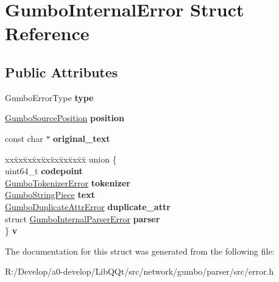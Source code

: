 \hypertarget{struct_gumbo_internal_error}{}\section{Gumbo\+Internal\+Error Struct Reference}
\label{struct_gumbo_internal_error}
\subsection*{Public Attributes}
\begin{DoxyCompactItemize}
\item 
\mbox{\label{struct_gumbo_internal_error_ae91295877ddbb3e94efdcfb4e093579c}} 
Gumbo\+Error\+Type {\bfseries type}
\item 
\mbox{\label{struct_gumbo_internal_error_aca2cd175d345fe73c4079b1c98227b16}} 
\mbox{\hyperlink{struct_gumbo_source_position}{Gumbo\+Source\+Position}} {\bfseries position}
\item 
\mbox{\label{struct_gumbo_internal_error_abeb5c98f414316a10c604482860834be}} 
const char $\ast$ {\bfseries original\+\_\+text}
\item 
\mbox{\label{struct_gumbo_internal_error_a7917dca0db753d3c79ca726fb591905f}} 
\begin{tabbing}
xx\=xx\=xx\=xx\=xx\=xx\=xx\=xx\=xx\=\kill
union \{\\
\>uint64\_t {\bfseries codepoint}\\
\>\mbox{\hyperlink{struct_gumbo_internal_tokenizer_error}{GumboTokenizerError}} {\bfseries tokenizer}\\
\>\mbox{\hyperlink{struct_gumbo_string_piece}{GumboStringPiece}} {\bfseries text}\\
\>\mbox{\hyperlink{struct_gumbo_internal_duplicate_attr_error}{GumboDuplicateAttrError}} {\bfseries duplicate\_attr}\\
\>struct \mbox{\hyperlink{struct_gumbo_internal_parser_error}{GumboInternalParserError}} {\bfseries parser}\\
\} {\bfseries v}\\

\end{tabbing}\end{DoxyCompactItemize}


The documentation for this struct was generated from the following file\+:\begin{DoxyCompactItemize}
\item 
R\+:/\+Develop/a0-\/develop/\+Lib\+Q\+Qt/src/network/gumbo/parser/src/error.\+h\end{DoxyCompactItemize}
